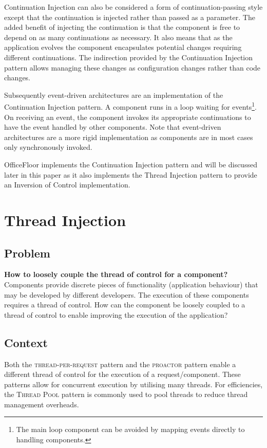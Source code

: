 \documentclass[prodmode]{style/acmlarge}
\begin{document}
Continuation Injection can also be considered a form of continuation-passing
style \cite{continuations} except that the continuation is injected rather than
passed as a parameter.  The added benefit of injecting the continuation is that
the component is free to depend on as many continuations as necessary.  It also
means that as the application evolves the component encapsulates potential
changes requiring different continuations.  The indirection provided by the
Continuation Injection pattern allows managing these changes as configuration
changes rather than code changes.

Subsequently event-driven architectures are an implementation of the
Continuation Injection pattern.  A component runs in a loop waiting for
events\footnote{The main loop component can be avoided by mapping events
directly to handling components.}.  On receiving an event, the component invokes
its appropriate continuations to have the event handled by other components. 
Note that event-driven architectures are a more rigid implementation as
components are in most cases only synchronously invoked.

OfficeFloor \cite{officefloor} implements the Continuation Injection pattern and
will be discussed later in this paper as it also implements the Thread Injection
pattern to provide an Inversion of Control implementation.



\section{Thread Injection}


\subsection{Problem}

\textbf{How to loosely couple the thread of control for a component?} 
Components provide discrete pieces of functionality (application behaviour) that
may be developed by different developers.  The execution of these components
requires a thread of control.  How can the component be loosely coupled to a
thread of control to enable improving the execution of the application?


\subsection{Context}

Both the \textsc{thread-per-request} pattern and the \textsc{proactor} pattern
enable a different thread of control for the execution of a request/component.
These patterns allow for concurrent execution by utilising many threads.  For
efficiencies, the \textsc{Thread Pool} pattern \cite{thread-per-request} is
commonly used to pool threads to reduce thread management overheads.
\end{document}
